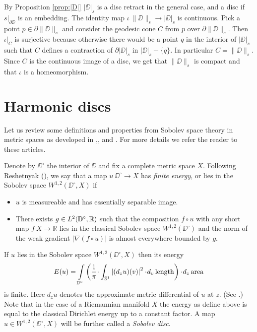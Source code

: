 \documentclass{article}
\begin{document}
By Proposition \ref{prop:|D|} $|\DD|_s$ is a disc retract in the general case, and a disc if $s|_{\partial\DD}$ is an embedding.
The identity map $\iota\:\|\DD\|_s\to |\DD|_s$ is continuous.
Pick a point $p\in\partial\|\DD\|_s$ and consider the geodesic 
cone $C$ from $p$ over $\partial\|\DD\|_s$.
Then $\iota|_C$ is surjective because otherwise there would be a point $q$ in the 
interior of $|\DD|_s$ such that $C$ defines a contraction of $\partial|\DD|_s$ in $|\DD|_s-\{q\}$. 
In particular $C=\|\DD\|_s$.
Since $C$ is the continuous image of a disc, we get that $\|\DD\|_s$ is compact and that $\iota$ is a homeomorphism.
\qeds

\section{Harmonic discs}\label{Harmonic discs}

Let us review some definitions and properties from Sobolev space theory in metric spaces as developed in 
\cite{KS},\cite{R}, \cite{HKST} and \cite{LW}. 
For more details we refer the reader to these articles.

Denote by  $\DD^\circ$ the interior of $\DD$ and fix a complete metric space $X$.
Following Reshetnyak (\cite{R}), we say that a map $u\:\DD^\circ\to X$ has {\em finite energy}, or lies in the Sobolev space $W^{1,2}(\DD^\circ,X)$ if
\begin{itemize}
 \item $u$ is measureable and has essentially separable image. %
 \item There exists $g\in L^2(\mathbb{D}^\circ,\mathbb{R})$ such that the composition $f\circ u$ with any short map $f\:X\to \mathbb{R}$ 
lies in the classical Sobolev space $W^{1,2}(\DD^\circ)$
 and the norm of the weak gradient $|\nabla(f\circ u)|$ is almost everywhere bounded by $g$.
\end{itemize}

If $u$ lies in the Sobolev space $W^{1,2}(\DD^\circ,X)$ then its energy 
\[E(u)=
\int\limits_{\DD^\circ}\left(\frac{1}{\pi}\cdot\int_{\mathbb{S}^1}\left|(d_zu)(v)\right|^2\cdot d_v\length\right)\cdot d_z\area\]
is finite. 
Here $d_zu$ denotes the approximate metric differential of $u$ at $z$.
(See \cite{LW}.)
Note that in the case of a Riemannian manifold $X$ the energy as define above is equal to
the classical Dirichlet energy up to a constant factor.
A map $u\in W^{1,2}(\DD^\circ,X)$ will be further called a \emph{Sobolev disc}.
\end{document}

